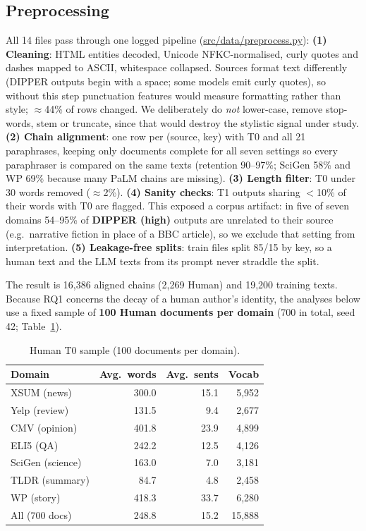 \subsection{Preprocessing}

All 14 files pass through one logged pipeline (\url{src/data/preprocess.py}):
\textbf{(1) Cleaning}: HTML entities decoded, Unicode NFKC-normalised, curly quotes and dashes
mapped to ASCII, whitespace collapsed. Sources format text differently (DIPPER outputs begin with
a space; some models emit curly quotes), so without this step punctuation features would measure
formatting rather than style; $\approx$44\% of rows changed. We deliberately do \emph{not}
lower-case, remove stop-words, stem or truncate, since that would destroy the stylistic signal
under study.
\textbf{(2) Chain alignment}: one row per (source, key) with T0 and all 21 paraphrases, keeping
only documents complete for all seven settings so every paraphraser is compared on the same texts
(retention 90--97\%; SciGen 58\% and WP 69\% because many PaLM chains are missing).
\textbf{(3) Length filter}: T0 under 30 words removed ($\approx$2\%).
\textbf{(4) Sanity checks}: T1 outputs sharing $<$10\% of their words with T0 are flagged. This
exposed a corpus artifact: in five of seven domains 54--95\% of \textbf{DIPPER (high)} outputs are
unrelated to their source (e.g.\ narrative fiction in place of a BBC article), so we exclude that
setting from interpretation.
\textbf{(5) Leakage-free splits}: train files split 85/15 by key, so a human text and the LLM texts
from its prompt never straddle the split.

The result is 16{,}386 aligned chains (2{,}269 Human) and 19{,}200 training texts. Because RQ1
concerns the decay of a human author's identity, the analyses below use a fixed sample of
\textbf{100 Human documents per domain} (700 in total, seed 42; Table~\ref{tab:corpus_stats}).

\begin{table}[t]
\small
\centering
\caption{Human T0 sample (100 documents per domain).}
\label{tab:corpus_stats}
\begin{tabular}{lrrr}
\toprule
\textbf{Domain} & \textbf{Avg.\ words} & \textbf{Avg.\ sents} & \textbf{Vocab} \\
\midrule
XSUM (news)       & 300.0 & 15.1 & 5{,}952 \\
Yelp (review)     & 131.5 &  9.4 & 2{,}677 \\
CMV (opinion)     & 401.8 & 23.9 & 4{,}899 \\
ELI5 (QA)         & 242.2 & 12.5 & 4{,}126 \\
SciGen (science)  & 163.0 &  7.0 & 3{,}181 \\
TLDR (summary)    &  84.7 &  4.8 & 2{,}458 \\
WP (story)        & 418.3 & 33.7 & 6{,}280 \\
\midrule
All (700 docs)    & 248.8 & 15.2 & 15{,}888 \\
\bottomrule
\end{tabular}
\end{table}

